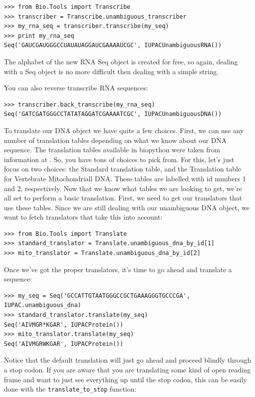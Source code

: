 \documentclass{report}
\begin{document}
\begin{verbatim}
>>> from Bio.Tools import Transcribe
>>> transcriber = Transcribe.unambiguous_transcriber
>>> my_rna_seq = transcriber.transcribe(my_seq)
>>> print my_rna_seq
Seq('GAUCGAUGGGCCUAUAUAGGAUCGAAAAUCGC', IUPACUnambiguousRNA())
\end{verbatim}

The alphabet of the new RNA Seq object is created for free, so again, dealing with a Seq object is no more difficult then dealing with a simple string.


You can also reverse transcribe RNA sequences:

\begin{verbatim}
>>> transcriber.back_transcribe(my_rna_seq)
Seq('GATCGATGGGCCTATATAGGATCGAAAATCGC', IUPACUnambiguousDNA())
\end{verbatim}


To translate our DNA object we have quite a few choices. First, we can use any number of translation tables depending on what we know about our DNA sequence. The translation tables available in biopython were taken from information at . So, you have tons of choices to pick from. For this, let's just focus on two choices: the Standard translation table, and the Translation table for Vertebrate Mitochondriall DNA. These tables are labelled with id numbers 1 and 2, respectively. Now that we know what tables we are looking to get, we're all set to perform a basic translation. First, we need to get our translators that use these tables. Since we are still dealing with our unambiguous DNA object, we want to fetch translators that take this into account:

\begin{verbatim}
>>> from Bio.Tools import Translate
>>> standard_translator = Translate.unambiguous_dna_by_id[1] 
>>> mito_translator = Translate.unambiguous_dna_by_id[2]
\end{verbatim}

Once we've got the proper translators, it's time to go ahead and translate a sequence:

\begin{verbatim}
>>> my_seq = Seq('GCCATTGTAATGGGCCGCTGAAAGGGTGCCCGA', IUPAC.unambiguous_dna)
>>> standard_translator.translate(my_seq)
Seq('AIVMGR*KGAR', IUPACProtein())
>>> mito_translator.translate(my_seq)
Seq('AIVMGRWKGAR', IUPACProtein())
\end{verbatim}

Notice that the default translation will just go ahead and proceed blindly through a stop codon. If you are aware that you are translating some kind of open reading frame and want to just see everything up until the stop codon, this can be easily done with the \verb|translate_to_stop| function:
\end{document}
